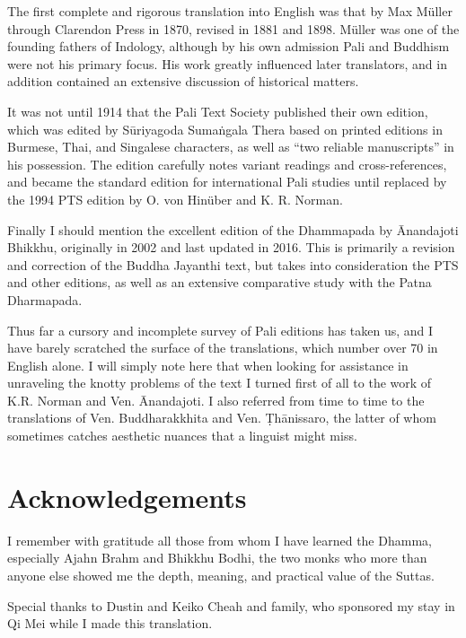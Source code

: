 \documentclass[12pt,openany]{book}%
\begin{document}
The first complete and rigorous translation into English was that by Max Müller through Clarendon Press in 1870, revised in 1881 and 1898. Müller was one of the founding fathers of Indology, although by his own admission Pali and Buddhism were not his primary focus. His work greatly influenced later translators, and in addition contained an extensive discussion of historical matters.

It was not until 1914 that the Pali Text Society published their own edition, which was edited by \textsanskrit{Sūriyagoda} \textsanskrit{Sumaṅgala} Thera based on printed editions in Burmese, Thai, and Singalese characters, as well as “two reliable manuscripts” in his possession. The edition carefully notes variant readings and cross-references, and became the standard edition for international Pali studies until replaced by the 1994 PTS edition by O. von Hinüber and K. R. Norman.

Finally I should mention the excellent edition of the Dhammapada by Ānandajoti Bhikkhu, originally in 2002 and last updated in 2016. This is primarily a revision and correction of the Buddha Jayanthi text, but takes into consideration the PTS and other editions, as well as an extensive comparative study with the Patna Dharmapada.

Thus far a cursory and incomplete survey of Pali editions has taken us, and I have barely scratched the surface of the translations, which number over 70 in English alone. I will simply note here that when looking for assistance in unraveling the knotty problems of the text I turned first of all to the work of K.R. Norman and Ven. Ānandajoti. I also referred from time to time to the translations of Ven. Buddharakkhita and Ven. \textsanskrit{Ṭhānissaro}, the latter of whom sometimes catches aesthetic nuances that a linguist might miss.

%
\chapter*{Acknowledgements}

I remember with gratitude all those from whom I have learned the Dhamma, especially Ajahn Brahm and Bhikkhu Bodhi, the two monks who more than anyone else showed me the depth, meaning, and practical value of the Suttas.

Special thanks to Dustin and Keiko Cheah and family, who sponsored my stay in Qi Mei while I made this translation.
\end{document}
